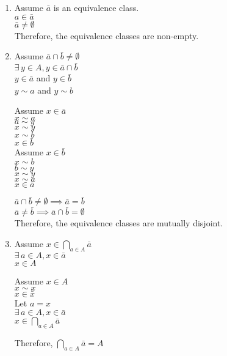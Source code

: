 \documentclass[letterpaper,12pt,fleqn]{article}
\begin{document}
\begin{theproof}
\listbreak
\begin{enumerate}
\item Assume $\bar{a}$ is an equivalence class. \\
$a\in\bar{a}$ \\
$\bar{a}\ne\emptyset$ \\
Therefore, the equivalence classes are non-empty.

\item Assume $\bar{a}\cap\bar{b}\ne\emptyset$ \\
$\exists\,y\in A,y\in\bar{a}\cap\bar{b}$ \\
$y\in\bar{a}$ and $y\in\bar{b}$ \\
$y\sim a$ and $y\sim b$ \\

\begin{multicols}{2}
Assume $x\in\bar{a}$ \\
$x\sim a$ \\
$a\sim y$ \\
$x\sim y$ \\
$x\sim b$ \\
$x\in\bar{b}$ \\

\columnbreak
Assume $x\in\bar{b}$ \\
$x\sim b$ \\
$b\sim y$ \\
$x\sim y$ \\
$x\sim a$ \\
$x\in\bar{a}$ \\
\end{multicols}

$\bar{a}\cap\bar{b}\ne\emptyset\implies\bar{a}=\bar{b}$ \\
$\bar{a}\ne\bar{b}\implies\bar{a}\cap\bar{b}=\emptyset$ \\
Therefore, the equivalence classes are mutually disjoint.

\item
\begin{multicols}{2}
Assume $x\in\bigcap_{a\in A}\bar{a}$ \\
$\exists\,a\in A,x\in\bar{a}$ \\
$x\in A$

\columnbreak
Assume $x\in A$ \\
$x\sim x$ \\
$x\in\bar{x}$ \\
Let $a=x$ \\
$\exists\,a\in A,x\in\bar{a}$ \\
$x\in\bigcap_{a\in A}\bar{a}$
\end{multicols}
Therefore, $\bigcap_{a\in A}\bar{a}=A$
\end{enumerate}
\end{theproof}
\end{document}
